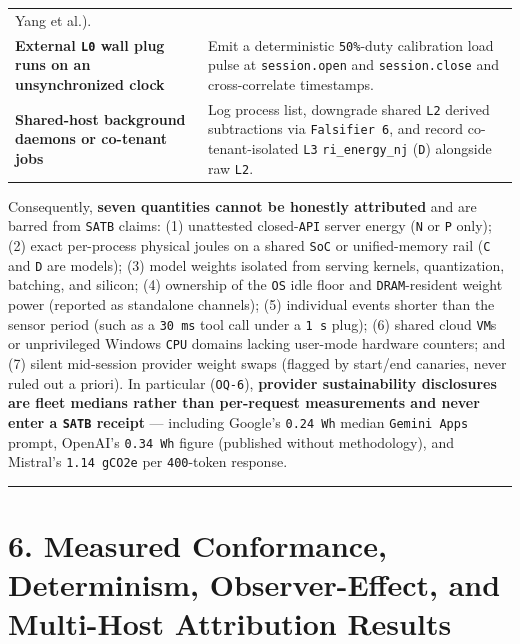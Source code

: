 \documentclass[10pt,letterpaper]{article}
\begin{document}
{\begin{longtable}[]{@{}
  >{\raggedright\arraybackslash}p{}
  >{\raggedright\arraybackslash}p{}@{}}
Yang et al.). \\
\textbf{External \texttt{L0} wall plug runs on an unsynchronized clock}
& Emit a deterministic \texttt{50\%}-duty calibration load pulse at
\texttt{session.\allowbreak{}open} and \texttt{session.\allowbreak{}close} and cross-correlate
timestamps. \\
\textbf{Shared-host background daemons or co-tenant jobs} & Log process
list, downgrade shared \texttt{L2} derived subtractions via
\texttt{Falsifier\ 6}, and record co-tenant-isolated \texttt{L3}
\texttt{ri\_\allowbreak{}energy\_\allowbreak{}nj} (\texttt{D}) alongside raw \texttt{L2}. \\
\end{longtable}
}

Consequently, \textbf{seven quantities cannot be honestly attributed}
and are barred from \texttt{SATB} claims: (1) unattested
closed-\texttt{API} server energy (\texttt{N} or \texttt{P} only); (2)
exact per-process physical joules on a shared \texttt{SoC} or
unified-memory rail (\texttt{C} and \texttt{D} are models); (3) model
weights isolated from serving kernels, quantization, batching, and
silicon; (4) ownership of the \texttt{OS} idle floor and
\texttt{DRAM}-resident weight power (reported as standalone channels);
(5) individual events shorter than the sensor period (such as a
\texttt{30\ ms} tool call under a \texttt{1\ s} plug); (6) shared cloud
\texttt{VM}s or unprivileged Windows \texttt{CPU} domains lacking
user-mode hardware counters; and (7) silent mid-session provider weight
swaps (flagged by start/end canaries, never ruled out a priori). In
particular (\texttt{OQ-6}), \textbf{provider sustainability disclosures
are fleet medians rather than per-request measurements and never enter a
\texttt{SATB} receipt} --- including Google's \texttt{0.24\ Wh} median
\texttt{Gemini\ Apps} prompt, OpenAI's \texttt{0.34\ Wh} figure
(published without methodology), and Mistral's \texttt{1.\allowbreak{}14\ gCO2e} per
\texttt{400}-token response.

\begin{center}\rule{0.5\linewidth}{0.5pt}\end{center}

\section{6. Measured Conformance, Determinism, Observer-Effect, and
Multi-Host Attribution
Results}\label{measured-conformance-determinism-observer-effect-and-multi-host-attribution-results}
\end{document}
